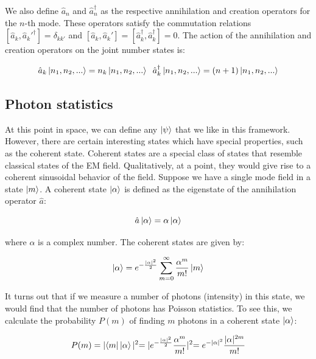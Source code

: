 We also define $\hat{a}_n$ and $\hat{a}_n^\dagger$ as the respective annihilation and creation operators for the $n$-th mode. These operators satisfy the commutation relations $[\hat{a}_k, \hat{a}_k'^\dagger] = \delta_{kk'}$ and $[\hat{a}_k, \hat{a}_k'] = [\hat{a}_k^\dagger, \hat{a}_k^\dagger] = 0$. The action of the annihilation and creation operators on the joint number states is:

\begin{equation*}
\hat{a}_k \ket{n_1, n_2, ...} = n_k \ket{n_1, n_2, ...} \;\;
\hat{a}_k^\dagger \ket{n_1, n_2, ...} = (n+1) \ket{n_1, n_2, ...}
\end{equation*}

\subsection{Photon statistics}

At this point in space, we can define any $\ket{\psi}$ that we like in this framework. However, there are certain interesting states which have special properties, such as the coherent state. Coherent states are a special class of states that resemble classical states of the EM field. Qualitatively, at a point, they would give rise to a coherent sinusoidal behavior of the field. Suppose we have a single mode field in a state $\ket{m}$. A coherent state $\ket{\alpha}$ is defined as the eigenstate of the annihilation operator $\hat{a}$:

\begin{equation*}
\hat{a} \ket{\alpha} = \alpha \ket{\alpha}
\end{equation*}

where $\alpha$ is a complex number. The coherent states are given by:

\begin{equation*}
\ket{\alpha} = e^{-\frac{\lvert\alpha\lvert^2}{2}} \sum_{m=0}^\infty \frac{\alpha^m}{m!} \ket{m}
\end{equation*}

It turns out that if we measure a number of photons (intensity) in this state, we would find that the number of photons has Poisson statistics. To see this, we calculate the probability $P(m)$ of finding $m$ photons in a coherent state $\ket{\alpha}$:

\begin{equation*}
P(m) = \lvert \bra{m} \ket{\alpha} \lvert^2 = \lvert e^{-\frac{\lvert\alpha\lvert^2}{2}} \frac{\alpha^m}{m!} \lvert^2 = e^{-\lvert\alpha\lvert^2} \frac{\lvert\alpha\lvert^{2m}}{m!}
\end{equation*}

